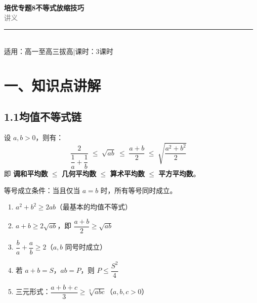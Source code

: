 \documentclass[12pt, a4paper]{ctexart}
\begin{document}
\begin{center}
{\Huge\bfseries\textcolor{mainblue}{培优专题8\quad 不等式放缩技巧}}\\[12pt]
{\Large\textcolor{gray}{讲\quad 义}}\\[8pt]
\rule{0.6\textwidth}{1pt}\\[8pt]
{\normalsize 适用：高一至高三拔高\quad |\quad 课时：3课时}
\end{center}
\vspace{10pt}

\section*{\textcolor{mainblue}{一、知识点讲解}}

\subsection*{1.1\quad 均值不等式链}

\begin{knowledgebox}[均值不等式链（调和—几何—算术—平方）]
设 $a,b>0$，则有：
\[
\frac{2}{\dfrac{1}{a}+\dfrac{1}{b}}
\;\leqslant\;
\sqrt{ab}
\;\leqslant\;
\frac{a+b}{2}
\;\leqslant\;
\sqrt{\frac{a^2+b^2}{2}}
\]
即 \textbf{调和平均数} $\leqslant$ \textbf{几何平均数} $\leqslant$ \textbf{算术平均数} $\leqslant$ \textbf{平方平均数}。

等号成立条件：当且仅当 $a=b$ 时，所有等号同时成立。
\end{knowledgebox}

\begin{tipbox}[常用变形与推广]
\begin{enumerate}[label=(\arabic*)]
  \item $a^2+b^2 \geqslant 2ab$（最基本的均值不等式）
  \item $a+b \geqslant 2\sqrt{ab}$，即 $\dfrac{a+b}{2} \geqslant \sqrt{ab}$
  \item $\dfrac{b}{a}+\dfrac{a}{b} \geqslant 2$（$a,b$ 同号时成立）
  \item 若 $a+b=S$，$ab=P$，则 $P \leqslant \dfrac{S^2}{4}$
  \item 三元形式：$\dfrac{a+b+c}{3} \geqslant \sqrt[3]{abc}$（$a,b,c>0$）
\end{enumerate}
\end{tipbox}
\end{document}

